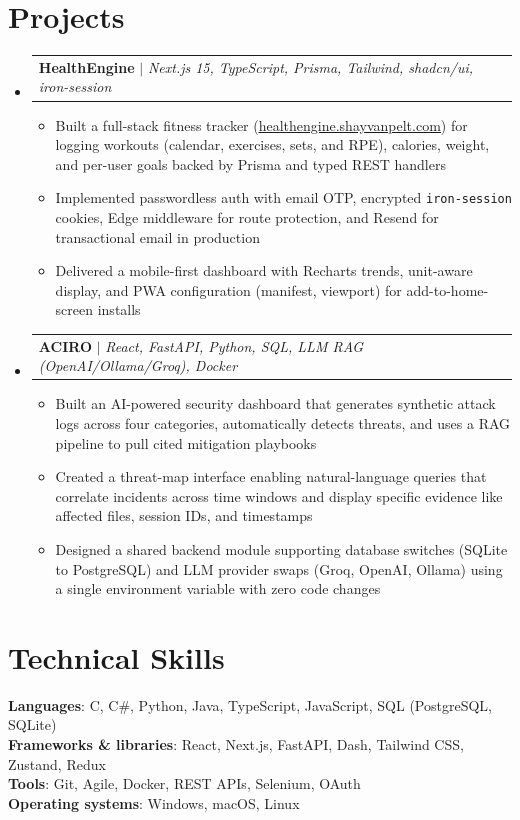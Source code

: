 \documentclass[letterpaper,11pt]{article}
\makeatletter
\newcommand{\resumeItem}[1]{
  \item\small{
    {#1 \vspace{-2pt}}
  }
}
\newcommand{\resumeProjectHeading}[2]{
    \item
    \begin{tabular*}{0.97\textwidth}{l@{\extracolsep{\fill}}r}
      \small#1 & #2 \\
    \end{tabular*}\vspace{-7pt}
}
\newcommand{\resumeSubHeadingListStart}{\begin{itemize}[leftmargin=0.15in, label={}]}
\newcommand{\resumeSubHeadingListEnd}{\end{itemize}}
\newcommand{\resumeItemListStart}{\begin{itemize}}
\newcommand{\resumeItemListEnd}{\end{itemize}\vspace{-5pt}}
\makeatother
\begin{document}
\section{Projects}
    \resumeSubHeadingListStart
      \resumeProjectHeading
          {\textbf{HealthEngine} $|$ \emph{Next.js 15, TypeScript, Prisma, Tailwind, shadcn/ui, iron-session}}{}
          \resumeItemListStart
            \resumeItem{Built a full-stack fitness tracker (\href{https://healthengine.shayvanpelt.com/}{\underline{healthengine.shayvanpelt.com}}) for logging workouts (calendar, exercises, sets, and RPE), calories, weight, and per-user goals backed by Prisma and typed REST handlers}
            \resumeItem{Implemented passwordless auth with email OTP, encrypted \texttt{iron-session} cookies, Edge middleware for route protection, and Resend for transactional email in production}
            \resumeItem{Delivered a mobile-first dashboard with Recharts trends, unit-aware display, and PWA configuration (manifest, viewport) for add-to-home-screen installs}
          \resumeItemListEnd
      \resumeProjectHeading
          {\textbf{ACIRO} $|$ \emph{React, FastAPI, Python, SQL, LLM RAG (OpenAI/Ollama/Groq), Docker}}{}
          \resumeItemListStart
            \resumeItem{Built an AI-powered security dashboard that generates synthetic attack logs across four categories, automatically detects threats, and uses a RAG pipeline to pull cited mitigation playbooks}
            \resumeItem{Created a threat-map interface enabling natural-language queries that correlate incidents across time windows and display specific evidence like affected files, session IDs, and timestamps}
            \resumeItem{Designed a shared backend module supporting database switches (SQLite to PostgreSQL) and LLM provider swaps (Groq, OpenAI, Ollama) using a single environment variable with zero code changes}
          \resumeItemListEnd
    \resumeSubHeadingListEnd



%
\section{Technical Skills}
 \begin{itemize}[leftmargin=0.15in, label={}]
    \small{\item{
     \textbf{Languages}{: C, C\#, Python, Java, TypeScript, JavaScript, SQL (PostgreSQL, SQLite)} \\
     \textbf{Frameworks \& libraries}{: React, Next.js, FastAPI, Dash, Tailwind CSS, Zustand, Redux} \\
     \textbf{Tools}{: Git, Agile, Docker, REST APIs, Selenium, OAuth} \\
     \textbf{Operating systems}{: Windows, macOS, Linux}
    }}
 \end{itemize}


\end{document}
